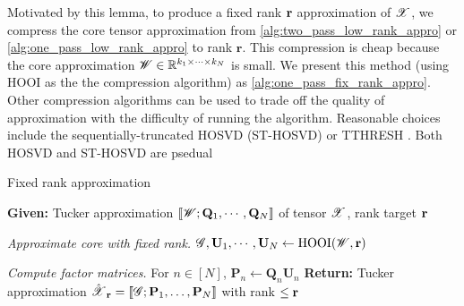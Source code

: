Motivated by this lemma, to produce a fixed rank $\mathbf{r}$ approximation of $\T{X}$,
we compress the core tensor approximation from
\ref{alg:two_pass_low_rank_appro} or \ref{alg:one_pass_low_rank_appro}
to rank $\mathbf{r}$.
This compression is cheap because the core approximation
$\T{W} \in \mathbb{R}^{k_1 \times \dots \times k_N}$
is small.
We present this method (using HOOI as the the compression algorithm)
as \ref{alg:one_pass_fix_rank_appro}.
Other compression algorithms can be used
to trade off the quality of approximation with the difficulty of running the algorithm.
Reasonable choices include the sequentially-truncated HOSVD (ST-HOSVD) \cite{vannieuwenhoven2012new}
or TTHRESH \cite{ballester2019tthresh}. Both HOSVD and ST-HOSVD are psedual 



\begin{algorithm}[H]
  \caption{Fixed rank approximation \label{alg:one_pass_fix_rank_appro}}
  \textbf{Given:} Tucker approximation
  $\llbracket\T{W}; \mathbf{Q}_1, \cdots, \mathbf{Q}_N\rrbracket$ of tensor $\T{X}$,
  rank target $\mathbf{r}$
  \ben
  \item \emph{Approximate core with fixed rank.}
  $\T{G}, \mathbf{U}_1, \cdots, \mathbf{U}_N \leftarrow
  \text{HOOI}( \T{W},\mathbf{r})$ \label{line:core-decom}
  \item \emph{Compute factor matrices.} For $n \in [N]$,
  $\mathbf{P}_n \leftarrow \mathbf{Q}_n \mathbf{U}_n$
  \een
  \textbf{Return:} Tucker approximation
  $\hat{\T{X}}_\V{r} = \llbracket\T{G}; \M{P}_1, \ldots, \M{P}_N \rrbracket$
  with rank $\leq \mathbf{r}$
\end{algorithm}

